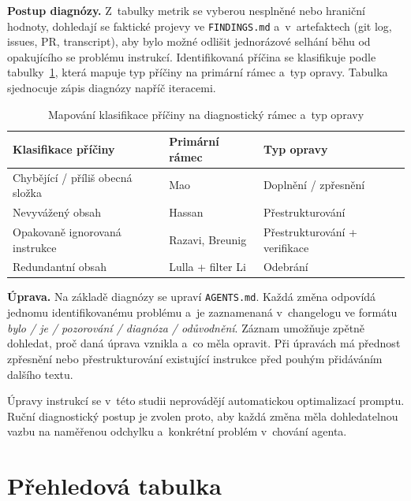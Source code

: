 \textbf{Postup diagnózy.} Z~tabulky metrik se vyberou nesplněné
nebo hraniční hodnoty, dohledají se faktické projevy ve
\texttt{FINDINGS.md} a~v~artefaktech (git log, issues, PR,
transcript), aby bylo možné odlišit jednorázové selhání běhu od
opakujícího se problému instrukcí. Identifikovaná příčina se
klasifikuje podle tabulky~\ref{tab:diagnostika-mapa}, která mapuje
typ příčiny na primární rámec a~typ opravy. Tabulka sjednocuje zápis
diagnózy napříč iteracemi.

\begin{table}[htbp]
\centering
\caption{Mapování klasifikace příčiny na diagnostický rámec a~typ opravy}
\label{tab:diagnostika-mapa}
\footnotesize
\setlength{\tabcolsep}{4pt}
\begin{tabular*}{\linewidth}{@{\extracolsep{\fill}}lll@{}}
\toprule
\textbf{Klasifikace příčiny} & \textbf{Primární rámec} & \textbf{Typ opravy} \\
\midrule
Chybějící / příliš obecná složka  & Mao             & Doplnění / zpřesnění \\
Nevyvážený obsah                  & Hassan          & Přestrukturování \\
Opakovaně ignorovaná instrukce    & Razavi, Breunig & Přestrukturování + verifikace \\
Redundantní obsah                 & Lulla + filter Li  & Odebrání \\
\bottomrule
\end{tabular*}
\end{table}
\FloatBarrier

\textbf{Úprava.} Na základě diagnózy se upraví \texttt{AGENTS.md}.
Každá změna odpovídá jednomu identifikovanému problému a~je
zaznamenaná v~changelogu ve formátu \textit{bylo / je / pozorování /
diagnóza / odůvodnění}. Záznam umožňuje zpětně dohledat, proč daná
úprava vznikla a~co měla opravit. Při úpravách má přednost zpřesnění
nebo přestrukturování existující instrukce před pouhým přidáváním
dalšího textu.

Úpravy instrukcí se v~této studii neprovádějí automatickou
optimalizací promptu. Ruční diagnostický postup je zvolen proto, aby
každá změna měla dohledatelnou vazbu na naměřenou odchylku
a~konkrétní problém v~chování agenta.



\section{Přehledová tabulka}
\label{sec:prehledova-tabulka}

